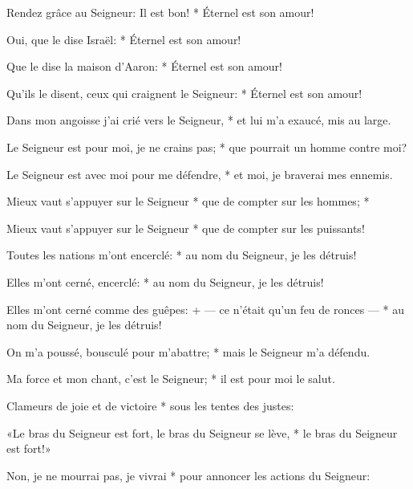 \item Rendez grâce au Seigneur: Il est bon! *
Éternel est son amour!

\item Oui, que le dise Israël: *
Éternel est son amour!

\item Que le dise la maison d'Aaron: *
Éternel est son amour!

\item Qu'ils le disent, ceux qui craignent le Seigneur: *
Éternel est son amour!

\item Dans mon angoisse j'ai crié vers le Seigneur, *
et lui m'a exaucé, mis au large.

\item Le Seigneur est pour moi, je ne crains pas; *
que pourrait un homme contre moi?

\item Le Seigneur est avec moi pour me défendre, *
et moi, je braverai mes ennemis.

\item Mieux vaut s'appuyer sur le Seigneur *
que de compter sur les hommes; *

\item Mieux vaut s'appuyer sur le Seigneur *
que de compter sur les puissants!

\item Toutes les nations m'ont encerclé: *
au nom du Seigneur, je les détruis!

\item Elles m'ont cerné, encerclé: *
au nom du Seigneur, je les détruis!

\item Elles m'ont cerné comme des guêpes: +
--– ce n'était qu'un feu de ronces --– *
au nom du Seigneur, je les détruis!

\item On m'a poussé, bousculé pour m'abattre; *
mais le Seigneur m'a défendu.

\item Ma force et mon chant, c'est le Seigneur; *
il est pour moi le salut.

\item Clameurs de joie et de victoire *
sous les tentes des justes:

\item «Le bras du Seigneur est fort, le bras du Seigneur se lève, *
le bras du Seigneur est fort!»

\item Non, je ne mourrai pas, je vivrai *
pour annoncer les actions du Seigneur:

